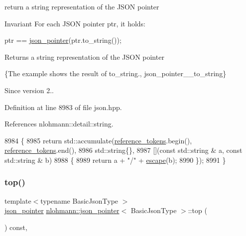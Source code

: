 return a string representation of the J\+S\+ON pointer 

\begin{DoxyInvariant}{Invariant}
For each J\+S\+ON pointer {\ttfamily ptr}, it holds\+: 
\begin{DoxyCode}
ptr == \hyperlink{classnlohmann_1_1json__pointer_a7f32d7c62841f0c4a6784cf741a6e4f8}{json\_pointer}(ptr.to\_string());
\end{DoxyCode}

\end{DoxyInvariant}
\begin{DoxyReturn}{Returns}
a string representation of the J\+S\+ON pointer
\end{DoxyReturn}
\{The example shows the result of {\ttfamily to\+\_\+string}., json\+\_\+pointer\+\_\+\+\_\+to\+\_\+string\}

\begin{DoxySince}{Since}
version 2.. 
\end{DoxySince}


Definition at line 8983 of file json.\+hpp.



References nlohmann\+::detail\+::string.


\begin{DoxyCode}
8984     \{
8985         \textcolor{keywordflow}{return} std::accumulate(\hyperlink{classnlohmann_1_1json__pointer_a07a990a6838de4f38ee9d881e7b9fd61}{reference\_tokens}.begin(), 
      \hyperlink{classnlohmann_1_1json__pointer_a07a990a6838de4f38ee9d881e7b9fd61}{reference\_tokens}.end(),
8986                                std::string\{\},
8987                                [](\textcolor{keyword}{const} std::string & a, \textcolor{keyword}{const} std::string & b)
8988         \{
8989             \textcolor{keywordflow}{return} a + \textcolor{stringliteral}{"/"} + \hyperlink{classnlohmann_1_1json__pointer_a8abf3577f9a0087f29a233893cdc73ad}{escape}(b);
8990         \});
8991     \}
\end{DoxyCode}
\mbox{\label{classnlohmann_1_1json__pointer_a00eff109d9a0091e42ada9b16b90c8d9}} 
\subsubsection{\texorpdfstring{top()}{top()}}
{\footnotesize\ttfamily template$<$typename Basic\+Json\+Type $>$ \\
\hyperlink{classnlohmann_1_1json__pointer}{json\+\_\+pointer} \hyperlink{classnlohmann_1_1json__pointer}{nlohmann\+::json\+\_\+pointer}$<$ Basic\+Json\+Type $>$\+::top (\begin{DoxyParamCaption}{ }\end{DoxyParamCaption}) const\hspace{0.3cm}{\ttfamily [inline]}, {\ttfamily [private]}}



